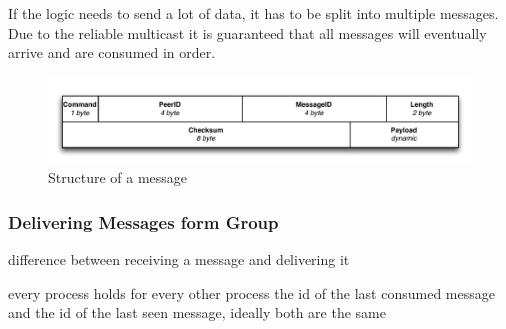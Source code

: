 
If the logic needs to send a lot of data, it has to be split into multiple messages. Due to the reliable multicast it is guaranteed that all messages will eventually arrive and are consumed in order.

\begin{figure}[htbp]
    \centering
        \includegraphics[width=.9\textwidth]{figures/message.pdf}
    \caption{Structure of a message}
    \label{fig:messages}
\end{figure}

\subsubsection{Delivering Messages form Group}

difference between receiving a message and delivering it

every process holds for every other process the id of the last consumed message and the id of the last seen message, ideally both are the same 

